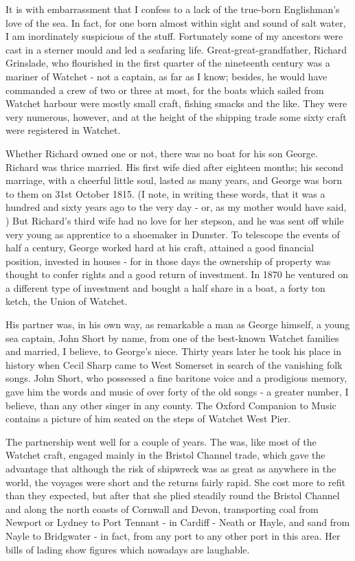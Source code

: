 It is with embarrassment that I confess to a lack of the true-born Englishman's love of the sea. In fact, for one born almost within sight and sound of salt water, I am inordinately suspicious of the stuff. Fortunately some of my ancestors were cast in a sterner mould and led a seafaring life. Great-great-grandfather, Richard Grinslade, who flourished in the first quarter of the nineteenth century was a mariner of Watchet - not a captain, as far as I know; besides, he would have commanded a crew of two or three at most, for the boats which sailed from Watchet harbour were mostly small craft, fishing smacks and the like. They were very numerous, however, and at the height of the shipping trade some sixty craft were registered in Watchet.

Whether Richard owned one or not, there was no boat for his son George. Richard was thrice married. His first wife died after eighteen months; his second marriage, with a cheerful little soul, lasted as many years, and George was born to them on 31st October 1815. (I note, in writing these words, that it was a hundred and sixty years ago to the very day - or, as my mother would have said, ) But Richard's third wife had no love for her stepson, and he was sent off while very young as apprentice to a shoemaker in Dunster.
To telescope the events of half a century, George worked hard at his craft, attained a good financial position, invested in houses - for in those days the ownership of property was thought to confer rights and a good return of investment. In 1870 he ventured on a different type of investment and bought a half share in a boat, a forty ton ketch, the Union of Watchet.

His partner was, in his own way, as remarkable a man as George himself, a young sea captain, John Short by name, from one of the best-known Watchet families and married, I believe, to George's niece. Thirty years later he took his place in history when Cecil Sharp came to West Somerset in search of the vanishing folk songs. John Short, who possessed a fine baritone voice and a prodigious memory, gave him the words and music of over forty of the old songs - a greater number, I believe, than any other singer in any county. The Oxford Companion to Music contains a picture of him seated on the steps of Watchet West Pier.

The partnership went well for a couple of years. The  was, like most of the Watchet craft, engaged mainly in the Bristol Channel trade, which gave the advantage that although the risk of shipwreck was as great as anywhere in the world, the voyages were short and the returns fairly rapid. She cost more to refit than they expected, but after that she plied steadily round the Bristol Channel and along the north coasts of Cornwall and Devon, transporting coal from Newport or Lydney to Port Tennant - in Cardiff - Neath or Hayle, and sand from Nayle to Bridgwater - in fact, from any port to any other port in this area. Her bills of lading show figures which nowadays are laughable.

